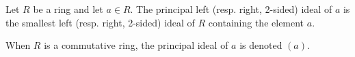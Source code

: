 \documentclass[12pt]{article}
\begin{document}
Let $R$ be a ring and let $a \in R$. The principal left (resp. right, 2-sided) ideal of $a$ is the smallest left (resp. right, 2-sided) ideal of $R$ containing the element $a$.

When $R$ is a commutative ring, the principal ideal of $a$ is denoted $(a)$.
\end{document}
